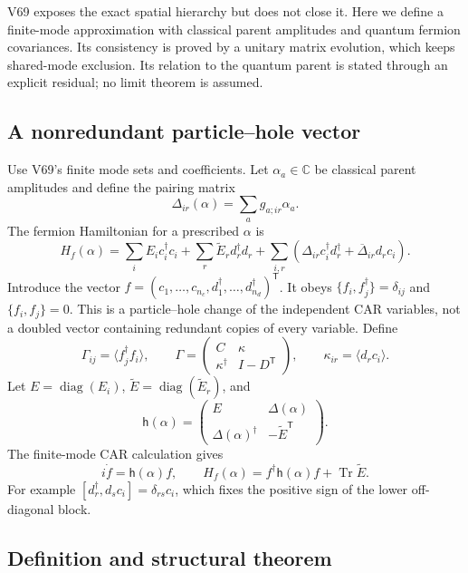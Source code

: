 \documentclass[11pt]{article}
\theoremstyle{remark}
\begin{document}
V69 exposes the exact spatial hierarchy but does not
close it.  Here we define a finite-mode approximation
with classical parent amplitudes and quantum fermion
covariances.  Its consistency is proved by a unitary
matrix evolution, which keeps shared-mode exclusion.
Its relation to the quantum parent is stated through
an explicit residual; no limit theorem is assumed.

\subsection{A nonredundant particle--hole vector}

Use V69's finite mode sets and coefficients.
Let \(\alpha_a\in\mathbb C\) be classical parent
amplitudes and define the pairing matrix
\[
 \Delta_{ir}(\alpha)=\sum_a g_{a;ir}\alpha_a .
\]
The fermion Hamiltonian for a prescribed \(\alpha\) is
\[
 H_f(\alpha)=\sum_iE_i c_i^\dagger c_i+
  \sum_r\widetilde E_r d_r^\dagger d_r+
  \sum_{i,r}(\Delta_{ir}c_i^\dagger d_r^\dagger+
                               \overline\Delta_{ir}d_rc_i).
\]
Introduce the vector \(f=(c_1,\ldots,c_{n_c},
d_1^\dagger,\ldots,d_{n_d}^\dagger)^{\mathsf T}\).
It obeys \(\{f_i,f_j^\dagger\}=\delta_{ij}\) and
\(\{f_i,f_j\}=0\).  This is a particle--hole change
of the independent CAR variables, not a doubled
vector containing redundant copies of every variable.
Define
\[
 \Gamma_{ij}=\langle f_j^\dagger f_i\rangle,\qquad
 \Gamma=
 \begin{pmatrix}C&\kappa\\\kappa^\dagger&I-D^{\mathsf T}\end{pmatrix},
 \qquad \kappa_{ir}=\langle d_rc_i\rangle .
\]
Let \(E=\operatorname{diag}(E_i)\),
\(\widetilde E=\operatorname{diag}(\widetilde E_r)\), and
\[
 \mathsf h(\alpha)=
 \begin{pmatrix}E&\Delta(\alpha)\\
          \Delta(\alpha)^\dagger&-\widetilde E^{\mathsf T}\end{pmatrix}.
\]
The finite-mode CAR calculation gives
\[
 i\dot f=\mathsf h(\alpha)f,\qquad
 H_f(\alpha)=f^\dagger\mathsf h(\alpha)f+
                                      \operatorname{Tr}\widetilde E.
\]
For example
\([d_r^\dagger,d_sc_i]=\delta_{rs}c_i\), which fixes
the positive sign of the lower off-diagonal block.

\subsection{Definition and structural theorem}
\end{document}
